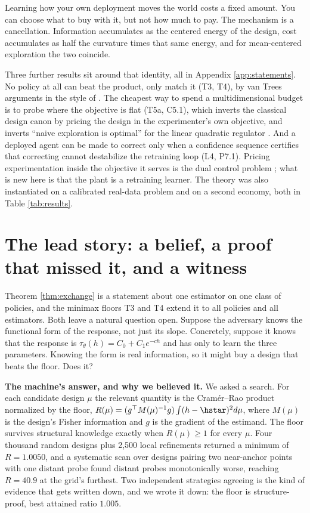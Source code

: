 \documentclass{article}
\begin{document}
Learning how your own deployment moves the world costs a fixed amount. You
can choose what to buy with it, but not how much to pay. The mechanism is a
cancellation. Information accumulates as the centered energy of the design,
cost accumulates as half the curvature times that same energy, and for
mean-centered exploration the two coincide.

Three further results sit around that identity, all in Appendix
\ref{app:statements}. No policy at all can beat the product, only match it
(T3, T4), by van Trees arguments in the style of \citet{gill1995applications}.
The cheapest way to spend a multidimensional budget is to probe where the
objective is flat (T5a, C5.1), which inverts the classical design canon
\citep{kiefer1960equivalence,pukelsheim2006optimal} by pricing the design in
the experimenter's own objective, and inverts ``naive exploration is optimal''
for the linear quadratic regulator \citep{simchowitz2020naive}. And a deployed
agent can be made to correct only when a confidence sequence certifies that
correcting cannot destabilize the retraining loop (L4, P7.1). Pricing
experimentation inside the objective it serves is the dual control problem
\citep{feldbaum1960dual,bombois2006least}; what is new here is that the plant
is a retraining learner. The theory was also instantiated
on a calibrated real-data problem and on a second economy, both in Table
\ref{tab:results}.

\section{The lead story: a belief, a proof that missed it, and a witness}
\label{sec:t9}

Theorem \ref{thm:exchange} is a statement about one estimator on one class of
policies, and the minimax floors T3 and T4 extend it to all policies and
all estimators. Both leave a natural question open. Suppose the adversary knows
the functional form of the response, not just its slope. Concretely, suppose
it knows that the response is $\tau_\theta(h) = C_0 + C_1 e^{-ch}$ and has
only to learn the three parameters. Knowing the form is real information, so
it might buy a design that beats the floor. Does it?

\textbf{The machine's answer, and why we believed it.} We asked a search. For
each candidate design $\mu$ the relevant quantity is the Cram\'er--Rao
product normalized by the floor,
$R(\mu) = (g^\top M(\mu)^{-1} g)\int (h-\hstar)^2 d\mu$, where $M(\mu)$ is
the design's Fisher information and $g$ is the gradient of the estimand. The
floor survives structural knowledge exactly when $R(\mu)\ge 1$ for every
$\mu$. Four thousand random designs plus 2,500 local refinements returned a
minimum of $R = 1.0050$, and a systematic scan over designs pairing two
near-anchor points with one distant probe found distant probes monotonically
worse, reaching $R = 40.9$ at the grid's furthest. Two independent strategies
agreeing is the kind of evidence that gets written down, and we wrote it
down: the floor is structure-proof, best attained ratio $1.005$.
\end{document}
